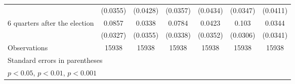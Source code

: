 \begin{table}[htbp]
\begin{tabular}{l*{6}{c}}
                    &    (0.0355)         &    (0.0428)         &    (0.0357)         &    (0.0434)         &    (0.0347)         &    (0.0411)         \\
[1em]
 6 quarters after the election&      0.0857\sym{**} &      0.0338         &      0.0784\sym{*}  &      0.0423         &       0.103\sym{***}&      0.0344         \\
                    &    (0.0327)         &    (0.0355)         &    (0.0338)         &    (0.0352)         &    (0.0306)         &    (0.0341)         \\
\hline
Observations        &       15938         &       15938         &       15938         &       15938         &       15938         &       15938         \\
\hline\hline
\multicolumn{7}{l}{\footnotesize Standard errors in parentheses}\\
\multicolumn{7}{l}{\footnotesize \sym{*} \(p<0.05\), \sym{**} \(p<0.01\), \sym{***} \(p<0.001\)}\\
\end{tabular}
\end{table}
